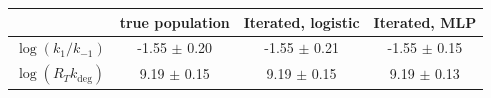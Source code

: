 \begin{tabular}{lccc}
\toprule
& true population & Iterated, logistic & Iterated, MLP \\
\midrule
$\log(k_1/k_{-1})$ & -1.55 $\pm$ 0.20 & -1.55 $\pm$ 0.21 & -1.55 $\pm$ 0.15 \\
$\log(R_T k_\mathrm{deg})$ & 9.19 $\pm$ 0.15 & 9.19 $\pm$ 0.15 & 9.19 $\pm$ 0.13 \\
\bottomrule
\end{tabular}
